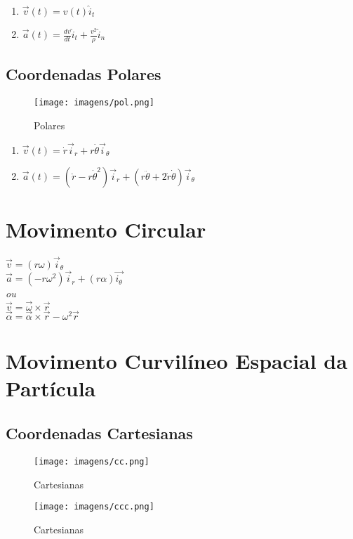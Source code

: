 \documentclass[a4paper, 12pt]{article}
\begin{document}
		\begin{enumerate}
			\item $\vec{v}(t) = v(t) \hat{i}_t$
			\item $\vec{a}(t) = \frac{dv}{dt} \hat{i}_t + \frac{v^2}{\rho} \hat{i}_n$
		\end{enumerate}
	
	\subsection{Coordenadas Polares}
		\begin{figure}[h]
			\center
			\texttt{[image: imagens/pol.png]} 
			\caption{Polares}
		\end{figure}	
		
		\begin{enumerate}
			\item $\vec{v}(t) = \dot{r}\vec{i}_r + r\dot{\theta} \vec{i}_{\theta}$
			\item $\vec{a}(t) = (\ddot{r} - r\dot{\theta}^2)\vec{i}_r + (r\ddot{\theta} + 2 \dot{r}\dot{\theta})\vec{i}_{\theta}$
		\end{enumerate}

\section{Movimento Circular}
	\begin{center}
		\Large
		$
		\vec{v} = (r\omega)\vec{i}_{\theta}		
		$\\
		$
		\vec{a} = (-r\omega^2)\vec{i}_r + (r\alpha)\vec{i_\theta}		
		$\\ \textit{ou}\\
		$
		\vec{v} = \vec{\omega} \times \vec{r}	
		$\\
		$
		\vec{\alpha} = \vec{\alpha} \times \vec{r} - \omega^2\vec{r}	
		$
	\end{center}

\section{Movimento Curvilíneo Espacial da Partícula}
	\subsection{Coordenadas Cartesianas}
		\begin{figure}[h]
			\center
			\texttt{[image: imagens/cc.png]} 
			\caption{Cartesianas}
		\end{figure}	
		\newpage
		\begin{figure}[h]
			\center
			\texttt{[image: imagens/ccc.png]} 
			\caption{Cartesianas}
		\end{figure}
\end{document}
